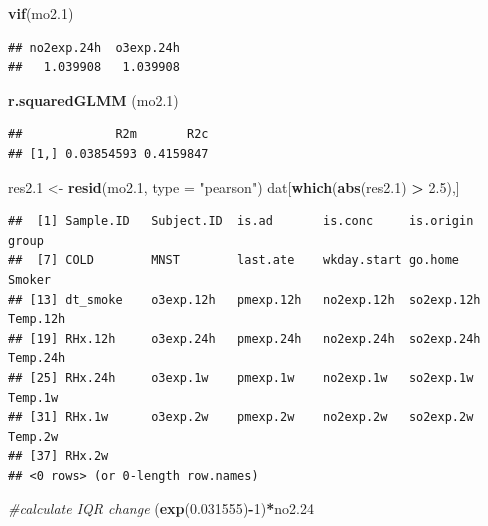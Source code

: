\documentclass[12pt,]{article}
\newenvironment{Shaded}{\begin{snugshade}}{\end{snugshade}}
\newcommand{\CommentTok}[1]{\textcolor[rgb]{0.56,0.35,0.01}{\textit{#1}}}
\newcommand{\DataTypeTok}[1]{\textcolor[rgb]{0.13,0.29,0.53}{#1}}
\newcommand{\DecValTok}[1]{\textcolor[rgb]{0.00,0.00,0.81}{#1}}
\newcommand{\FloatTok}[1]{\textcolor[rgb]{0.00,0.00,0.81}{#1}}
\newcommand{\KeywordTok}[1]{\textcolor[rgb]{0.13,0.29,0.53}{\textbf{#1}}}
\newcommand{\NormalTok}[1]{#1}
\newcommand{\OperatorTok}[1]{\textcolor[rgb]{0.81,0.36,0.00}{\textbf{#1}}}
\newcommand{\StringTok}[1]{\textcolor[rgb]{0.31,0.60,0.02}{#1}}
\begin{document}
\begin{Shaded}
\begin{Highlighting}[]
\KeywordTok{vif}\NormalTok{(mo2}\FloatTok{.1}\NormalTok{)}
\end{Highlighting}
\end{Shaded}

\begin{verbatim}
## no2exp.24h  o3exp.24h 
##   1.039908   1.039908
\end{verbatim}

\begin{Shaded}
\begin{Highlighting}[]
\KeywordTok{r.squaredGLMM}\NormalTok{ (mo2}\FloatTok{.1}\NormalTok{)}
\end{Highlighting}
\end{Shaded}

\begin{verbatim}
##             R2m       R2c
## [1,] 0.03854593 0.4159847
\end{verbatim}

\begin{Shaded}
\begin{Highlighting}[]
\NormalTok{res2}\FloatTok{.1}\NormalTok{ <-}\StringTok{ }\KeywordTok{resid}\NormalTok{(mo2}\FloatTok{.1}\NormalTok{, }\DataTypeTok{type =} \StringTok{"pearson"}\NormalTok{)}
\NormalTok{dat[}\KeywordTok{which}\NormalTok{(}\KeywordTok{abs}\NormalTok{(res2}\FloatTok{.1}\NormalTok{) }\OperatorTok{>}\StringTok{ }\FloatTok{2.5}\NormalTok{),]}
\end{Highlighting}
\end{Shaded}

\begin{verbatim}
##  [1] Sample.ID   Subject.ID  is.ad       is.conc     is.origin   group      
##  [7] COLD        MNST        last.ate    wkday.start go.home     Smoker     
## [13] dt_smoke    o3exp.12h   pmexp.12h   no2exp.12h  so2exp.12h  Temp.12h   
## [19] RHx.12h     o3exp.24h   pmexp.24h   no2exp.24h  so2exp.24h  Temp.24h   
## [25] RHx.24h     o3exp.1w    pmexp.1w    no2exp.1w   so2exp.1w   Temp.1w    
## [31] RHx.1w      o3exp.2w    pmexp.2w    no2exp.2w   so2exp.2w   Temp.2w    
## [37] RHx.2w     
## <0 rows> (or 0-length row.names)
\end{verbatim}

\begin{Shaded}
\begin{Highlighting}[]
\CommentTok{#calculate IQR change}
\NormalTok{(}\KeywordTok{exp}\NormalTok{(}\FloatTok{0.031555}\NormalTok{)}\OperatorTok{-}\DecValTok{1}\NormalTok{)}\OperatorTok{*}\NormalTok{no2}\FloatTok{.24}
\end{Highlighting}
\end{Shaded}
\end{document}
